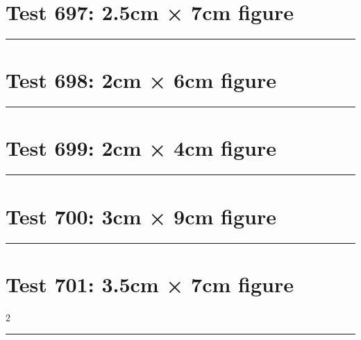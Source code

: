 \documentclass[a4paper,11pt]{article}
\begin{document}
\section*{Test 697: 2.5cm × 7cm figure}
\begin{swarmwrap}%
  \begin{minipage}[t]{2cm}
    \centering
    \rule{\linewidth}{7cm}
  \end{minipage}%
\end{swarmwrap}%
\swarmwrapnext
\lipsum[125]
\lipsum[126]
\lipsum[127]
\section*{Test 698: 2cm × 6cm figure}
\begin{swarmwrap}%
  \begin{minipage}[t]{2cm}
    \centering
    \rule{\linewidth}{6cm}
  \end{minipage}%
\end{swarmwrap}%
\swarmwrapnext
\lipsum[23]
\lipsum[24]
\lipsum[25]
\lipsum[26]
\lipsum[27]
\lipsum[28]
\section*{Test 699: 2cm × 4cm figure}
\begin{swarmwrap}%
  \begin{minipage}[t]{2cm}
    \centering
    \rule{\linewidth}{4cm}
  \end{minipage}%
\end{swarmwrap}%
\swarmwrapnext
\lipsum[81]
\lipsum[82]
\lipsum[83]
\lipsum[84]
\lipsum[85]
\section*{Test 700: 3cm × 9cm figure}
\begin{swarmwrap}%
  \begin{minipage}[t]{3cm}
    \centering
    \rule{\linewidth}{9cm}
  \end{minipage}%
\end{swarmwrap}%
\swarmwrapnext
\lipsum[135]
\lipsum[136]
\lipsum[137]
\lipsum[138]
\section*{Test 701: 3.5cm × 7cm figure}
\begin{multicols}{2}
  \begin{swarmwrap}%
    \begin{minipage}[t]{3cm}
      \centering
      \rule{\linewidth}{7cm}
    \end{minipage}%
  \end{swarmwrap}%
  \swarmwrapnext
  \lipsum[26]
  \lipsum[27]
  \lipsum[28]
  \lipsum[29]
  \lipsum[30]
  \lipsum[31]
\end{multicols}
\end{document}
